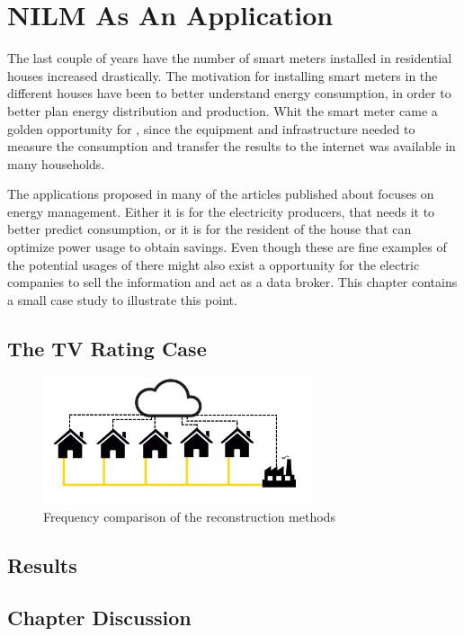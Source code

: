 \chapter{NILM As An Application} 
The last couple of years have the number of smart meters installed in residential houses increased drastically. The motivation for installing smart meters in the different houses have been to better understand energy consumption, in order to better plan energy distribution and production. Whit the smart meter came a golden opportunity for , since the equipment and infrastructure needed to measure the consumption and transfer the results to the internet was available in many households. 

The applications proposed in many of the articles published about  focuses on energy management. Either it is for the electricity producers, that needs it to better predict consumption, or it is for the resident of the house that can optimize power usage to obtain savings. Even though these are fine examples of the potential usages of  there might also exist a opportunity for the electric companies to sell the  information and act as a data broker. This chapter contains a small case study to illustrate this point. 


\section{The TV Rating Case}

\begin{figure}[H]
\centering
\includegraphics[width=0.7\textwidth]{billeder/CaseIlu.png}
\caption{Frequency comparison of the reconstruction methods}
\label{fig:SLC}
\end{figure}

\section{Results}


\section{Chapter Discussion}

